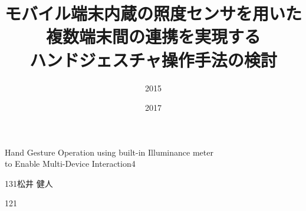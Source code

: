 \documentclass[a4paper,11pt]{jreport}
\begin{document}

\begin{toppage}


\title{モバイル端末内蔵の照度センサを用いた\\複数端末間の連携を実現する\\ハンドジェスチャ操作手法の検討}{Hand Gesture Operation using built-in Illuminance meter\\to Enable Multi-Device Interaction}{4}


\author{2015}{131}{松井 健人}


\date{2017}{1}{21}

\end{toppage}

\begin{abstract}

\end{abstract}

\contents
%


\newpage

\newpage

\newpage

\newpage

\newpage

\newpage

\newpage

\newpage
\end{document}
